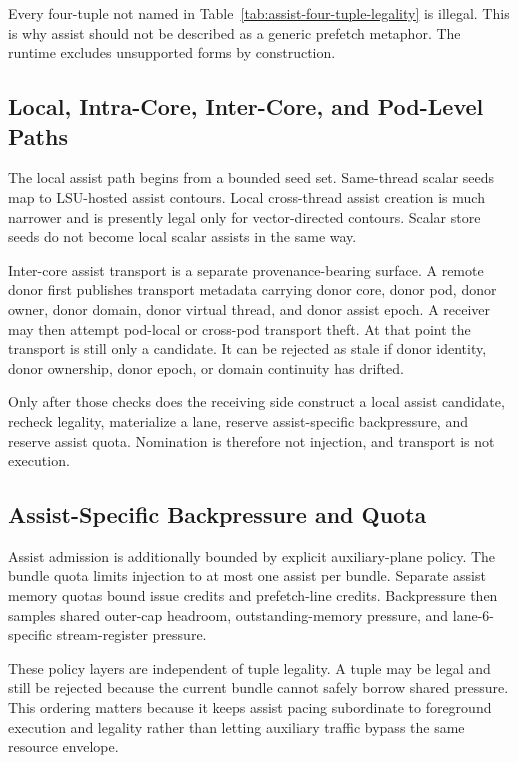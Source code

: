 \documentclass[twocolumn]{article}
\begin{document}
Every four-tuple not named in Table~\ref{tab:assist-four-tuple-legality} is illegal. This is why assist should not be described as a generic prefetch metaphor. The runtime excludes unsupported forms by construction.


\subsection{Local, Intra-Core, Inter-Core, and Pod-Level Paths}

The local assist path begins from a bounded seed set. Same-thread scalar seeds map to LSU-hosted assist contours. Local cross-thread assist creation is much narrower and is presently legal only for vector-directed contours. Scalar store seeds do not become local scalar assists in the same way.

Inter-core assist transport is a separate provenance-bearing surface. A remote donor first publishes transport metadata carrying donor core, donor pod, donor owner, donor domain, donor virtual thread, and donor assist epoch. A receiver may then attempt pod-local or cross-pod transport theft. At that point the transport is still only a candidate. It can be rejected as stale if donor identity, donor ownership, donor epoch, or domain continuity has drifted.

Only after those checks does the receiving side construct a local assist candidate, recheck legality, materialize a lane, reserve assist-specific backpressure, and reserve assist quota. Nomination is therefore not injection, and transport is not execution.


\subsection{Assist-Specific Backpressure and Quota}

Assist admission is additionally bounded by explicit auxiliary-plane policy. The bundle quota limits injection to at most one assist per bundle. Separate assist memory quotas bound issue credits and prefetch-line credits. Backpressure then samples shared outer-cap headroom, outstanding-memory pressure, and lane-6-specific stream-register pressure.

These policy layers are independent of tuple legality. A tuple may be legal and still be rejected because the current bundle cannot safely borrow shared pressure. This ordering matters because it keeps assist pacing subordinate to foreground execution and legality rather than letting auxiliary traffic bypass the same resource envelope.
\end{document}

